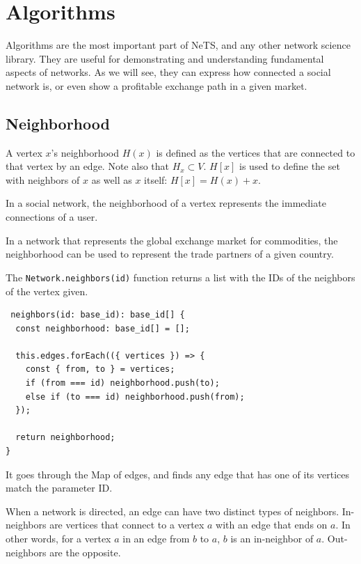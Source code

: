 \chapter{Algorithms}

Algorithms are the most important part of NeTS,
and any other network science library.
They are useful for demonstrating and understanding
fundamental aspects of networks.
As we will see, they can express how connected
a social network is, or even show a profitable exchange path
in a given market.

\section{Neighborhood}
A vertex $x$'s neighborhood $H(x)$ is defined as the vertices that are connected to that vertex
by an edge. Note also that $H_x\subset V$.
$H[x]$ is used to define the set with neighbors of $x$ as well as $x$ itself: $H[x]=H(x)+x$.

In a social network, the neighborhood of a vertex represents
the immediate connections of a user.

In a network that represents the global exchange market for
commodities, the neighborhood can be used to represent
the trade partners of a given country.

The \texttt{Network.neighbors(id)}
function returns a list with the IDs of the neighbors of the vertex given.

\begin{verbatim}
 neighbors(id: base_id): base_id[] {
  const neighborhood: base_id[] = [];

  this.edges.forEach(({ vertices }) => {
    const { from, to } = vertices;
    if (from === id) neighborhood.push(to);
    else if (to === id) neighborhood.push(from);
  });

  return neighborhood;
}
\end{verbatim}

It goes through the Map of edges,
and finds any edge that has one of its vertices match the parameter ID.

When a network is directed, an edge can have two distinct types of neighbors.
In-neighbors are vertices that connect to a vertex $a$ with an edge that ends on $a$.
In other words, for a vertex $a$ in an edge from $b$ to $a$, $b$ is an in-neighbor of $a$.
Out-neighbors are the opposite.

